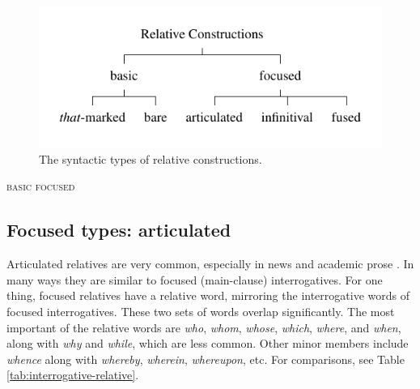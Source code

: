 \begin{figure}[ht]
    \centering
    \includegraphics{figures/relative-types.pdf}
    \caption{The syntactic types of relative constructions.}
    \label{fig:relative-construction-types}
\end{figure}

\ea \textsc{basic}\label{ex:basic-rel-clause-types}
    \z
\z
\ea \textsc{focused}\label{ex:focused-rel-clause-types}
    \z
\z

\subsection{Focused types: articulated}\label{sec:focused-articulated}

Articulated relatives are very common, especially in news and academic prose \citep[610 \& 611]{Biber1999}. In many ways they are similar to focused (main-clause) interrogatives. For one thing, focused relatives have a relative word, mirroring the interrogative words of focused interrogatives. These two sets of words overlap significantly. The most important of the relative words are \textit{who}, \textit{whom}, \textit{whose}, \textit{which}, \textit{where}, and \textit{when}, along with \textit{why} and \textit{while}, which are less common.  Other minor members include \textit{whence} along with \textit{whereby}, \textit{wherein}, \textit{whereupon}, etc. For comparisons, see Table \ref{tab:interrogative-relative}.

